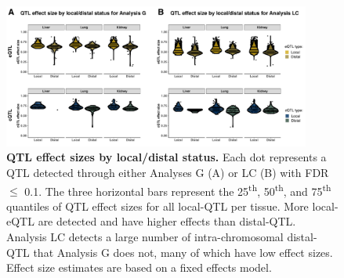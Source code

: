 \documentclass[9pt,twocolumn,twoside]{gsajnl}
\begin{document}
%

\begin{figure}[h]
\centering
\includegraphics[width=0.9\textwidth, trim={0in 0.25in 0in 0in}, clip]{figs/qtl_effect_sizes_local_v_distal.pdf}
\caption{\textbf{QTL effect sizes by local/distal status.} Each dot represents a QTL detected through either Analyses G (A) or LC (B) with FDR $\leq$ 0.1. The three horizontal bars represent the 25\textsuperscript{th}, 50\textsuperscript{th}, and 75\textsuperscript{th} quantiles of QTL effect sizes for all local-QTL per tissue. More local-eQTL are detected and have higher effects than distal-QTL. Analysis LC detects a large number of intra-chromosomal distal-QTL that Analysis G does not, many of which have low effect sizes. Effect size estimates are based on a fixed effects model.
\label{fig:qtl_effect_sizes_local_v_distal}}
\end{figure}
\end{document}
